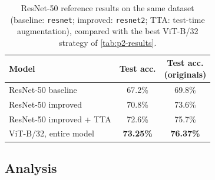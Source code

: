 \begin{table}[t]
  \centering
  \small
  \begin{tabular}{@{}lcc@{}}
    \toprule
    Model & Test acc. & \makecell{Test acc.\\(originals)} \\
    \midrule
    ResNet-50 baseline & 67.2\% & 69.8\% \\
    ResNet-50 improved & 70.8\% & 73.6\% \\
    ResNet-50 improved + TTA & 72.6\% & 75.7\% \\
    \midrule
    ViT-B/32, entire model & \textbf{73.25\%} & \textbf{76.37\%} \\
    \bottomrule
  \end{tabular}
  \caption{ResNet-50 reference results on the same dataset (baseline: \texttt{resnet}; improved: \texttt{resnet2}; TTA: test-time augmentation), compared with the best ViT-B/32 strategy of \cref{tab:p2-results}.}
  \label{tab:p2-resnet}
\end{table}

\subsection{Analysis}
\label{sec:p2-analysis}

